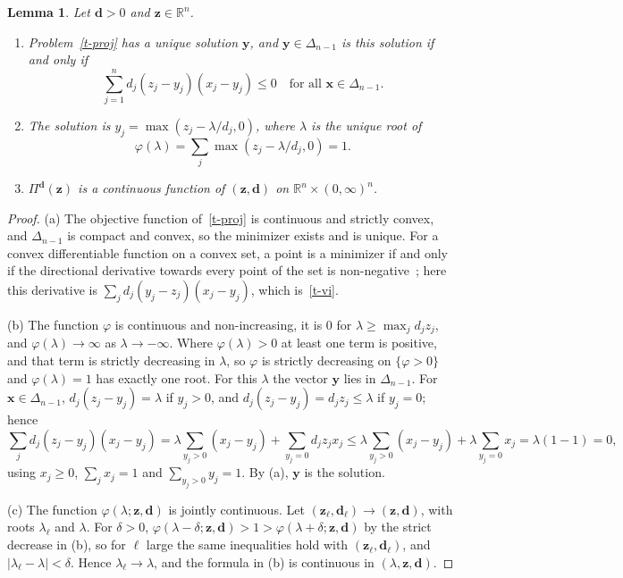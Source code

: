 \documentclass[11pt]{article}
\theoremstyle{plain}
\newtheorem{lemma}[theorem]{Lemma}
\theoremstyle{remark}
\numberwithin{equation}{section}
\begin{document}
\begin{lemma}\label{t-proj-prop}
Let $\bm d>0$ and $\bm z\in\mathbb{R}^n$.
\begin{enumerate}
\item[(a)] Problem~\eqref{t-proj} has a unique solution $\bm y$, and
$\bm y\in\Delta_{n-1}$ is this solution if and only if
\begin{equation}\label{t-vi}
\sum_{j=1}^n d_j\left(z_j-y_j\right)\left(x_j-y_j\right)\le 0
\quad\text{for all }\bm x\in\Delta_{n-1}.
\end{equation}
\item[(b)] The solution is $y_j=\max\left(z_j-\lambda/d_j,0\right)$, where
$\lambda$ is the unique root of
\begin{equation*}
\varphi(\lambda)=\sum_j\max\left(z_j-\lambda/d_j,0\right)=1 .
\end{equation*}
\item[(c)] $\Pi^{\bm d}(\bm z)$ is a continuous function of $(\bm z,\bm d)$
on $\mathbb{R}^n\times(0,\infty)^n$.
\end{enumerate}
\end{lemma}
\begin{proof}
(a) The objective function of~\eqref{t-proj} is continuous and strictly convex,
and $\Delta_{n-1}$ is compact and convex, so the minimizer exists and is
unique. For a convex differentiable function on a convex set, a point is a
minimizer if and only if the directional derivative towards every point of the
set is non-negative~\cite[Section 4.2.3]{2004Boyd_Vandenberghe}; here this
derivative is $\sum_j d_j(y_j-z_j)(x_j-y_j)$, which is~\eqref{t-vi}.

(b) The function $\varphi$ is continuous and non-increasing, it is
$0$ for $\lambda\ge\max_j d_jz_j$, and $\varphi(\lambda)\to\infty$ as
$\lambda\to-\infty$. Where $\varphi(\lambda)>0$ at least one term is positive,
and that term is strictly decreasing in $\lambda$, so $\varphi$ is strictly
decreasing on $\{\varphi>0\}$ and $\varphi(\lambda)=1$ has exactly one root.
For this $\lambda$ the vector $\bm y$ lies in $\Delta_{n-1}$. For
$\bm x\in\Delta_{n-1}$, $d_j(z_j-y_j)=\lambda$ if $y_j>0$, and
$d_j(z_j-y_j)=d_jz_j\le\lambda$ if $y_j=0$; hence
\begin{equation}
\sum_j d_j(z_j-y_j)(x_j-y_j)
=\lambda\sum_{y_j>0}(x_j-y_j)+\sum_{y_j=0}d_jz_jx_j
\le\lambda\sum_{y_j>0}(x_j-y_j)+\lambda\sum_{y_j=0}x_j
=\lambda\left(1-1\right)=0,
\end{equation}
using $x_j\ge 0$, $\sum_jx_j=1$ and $\sum_{y_j>0}y_j=1$. By (a), $\bm y$ is the
solution.

(c) The function $\varphi(\lambda;\bm z,\bm d)$ is jointly continuous. Let
$(\bm z_\ell,\bm d_\ell)\to(\bm z,\bm d)$, with roots $\lambda_\ell$ and
$\lambda$. For $\delta>0$, $\varphi(\lambda-\delta;\bm z,\bm d)>1>\varphi(\lambda+\delta;\bm z,\bm d)$
by the strict decrease in (b), so for $\ell$ large the same inequalities hold
with $(\bm z_\ell,\bm d_\ell)$, and $|\lambda_\ell-\lambda|<\delta$. Hence
$\lambda_\ell\to\lambda$, and the formula in (b) is continuous in
$(\lambda,\bm z,\bm d)$.
\end{proof}
\end{document}

